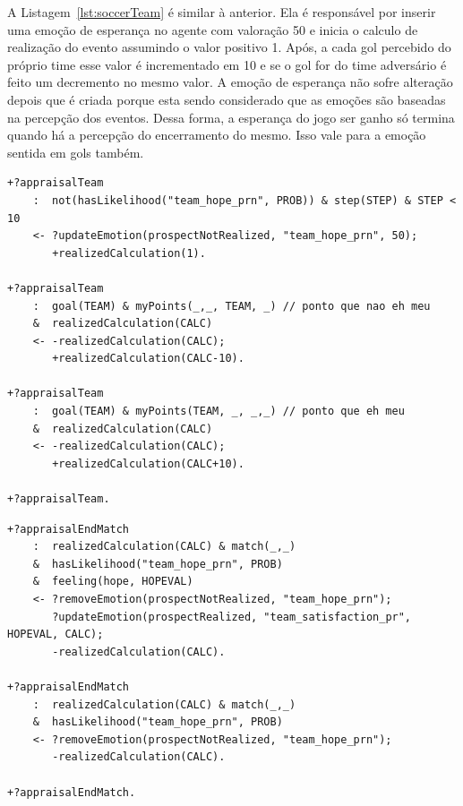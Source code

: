 A Listagem~\ref{lst:soccerTeam} é similar à anterior. Ela é responsável por inserir uma
emoção de esperança no agente com valoração 50 e inicia o calculo de
realização do evento assumindo o valor positivo 1. Após, a cada gol percebido
do próprio time esse valor é incrementado em 10 e se o gol for do time
adversário é feito um decremento no mesmo valor. A emoção de esperança não
sofre alteração depois que é criada porque esta sendo considerado que as
emoções são baseadas na percepção dos eventos. Dessa forma, a esperança do
jogo ser ganho só termina quando há a percepção do encerramento do mesmo. Isso
vale para a emoção sentida em gols também.%

\begin{center}
    \begin{minipage}{130mm}
	\lstset{linewidth=130mm}
	\begin{lstlisting}[frame=trbl,
caption=Parte do código do agente referente ao andamento do jogo,
label=lst:soccerTeam]
+?appraisalTeam
    :  not(hasLikelihood("team_hope_prn", PROB)) & step(STEP) & STEP < 10
    <- ?updateEmotion(prospectNotRealized, "team_hope_prn", 50);
       +realizedCalculation(1).

+?appraisalTeam
    :  goal(TEAM) & myPoints(_,_, TEAM, _) // ponto que nao eh meu
    &  realizedCalculation(CALC)
    <- -realizedCalculation(CALC);
       +realizedCalculation(CALC-10).

+?appraisalTeam
    :  goal(TEAM) & myPoints(TEAM, _, _,_) // ponto que eh meu
    &  realizedCalculation(CALC)
    <- -realizedCalculation(CALC);
       +realizedCalculation(CALC+10).

+?appraisalTeam.
	\end{lstlisting}
    \end{minipage}
\end{center}

\begin{center}
    \begin{minipage}{140mm}
	\lstset{linewidth=140mm}
	\begin{lstlisting}[frame=trbl,
caption=Parte do código do agente referente à avaliação do final do jogo para
as emoções de probabilidade,
label=lst:soccerEnd1]
+?appraisalEndMatch
    :  realizedCalculation(CALC) & match(_,_)
    &  hasLikelihood("team_hope_prn", PROB)
    &  feeling(hope, HOPEVAL)
    <- ?removeEmotion(prospectNotRealized, "team_hope_prn");
       ?updateEmotion(prospectRealized, "team_satisfaction_pr", HOPEVAL, CALC);
       -realizedCalculation(CALC).

+?appraisalEndMatch
    :  realizedCalculation(CALC) & match(_,_)
    &  hasLikelihood("team_hope_prn", PROB)
    <- ?removeEmotion(prospectNotRealized, "team_hope_prn");
       -realizedCalculation(CALC).

+?appraisalEndMatch.
	\end{lstlisting}
    \end{minipage}
\end{center}

